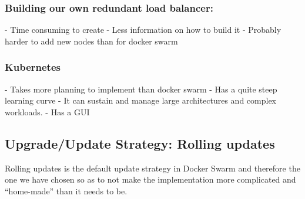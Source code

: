 \subsubsection{Building our own redundant load balancer:}

- Time consuming to create
- Less information on how to build it
- Probably harder to add new nodes than for docker swarm

\subsubsection{Kubernetes}

- Takes more planning to implement than docker swarm
- Has a quite steep learning curve
- It can sustain and manage large architectures and complex workloads.
- Has a GUI

\subsection{Upgrade/Update Strategy: Rolling updates}

Rolling updates is the default update strategy in Docker Swarm and therefore the one we have chosen so as to not make the implementation more complicated and “home-made” than it needs to be.
